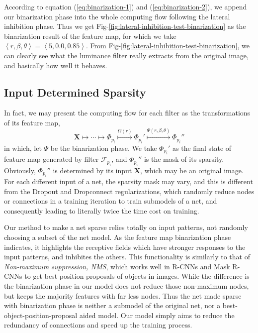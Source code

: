 \documentclass[conference]{IEEEtran}
\begin{document}
According to equation (\ref{eq:binarization-1}) and (\ref{eq:binarization-2}), we append our binarization phase
into the whole computing flow following the lateral inhibition phase. Thus we get
Fig-\ref{fig:lateral-inhibition-test-binarization}
as the binarization result of the feature map, for which we take
$\left<r,\beta,\theta\right>=\left<5,0.0,0.85\right>$.
From Fig-\ref{fig:lateral-inhibition-test-binarization},
we can clearly see what the luminance filter really extracts
from the original image, and basically how well it behaves.

\subsection{Input Determined Sparsity}
In fact, we may present the computing flow for each filter as the transformations of its feature map,
$$\mathbf{X}\longmapsto\cdots\longmapsto\Phi_{p_i}
\overset{\Omega(r)}{\longmapsto}\Phi_{p_i}'
\overset{\Psi(r,\beta,\theta)}{\longmapsto}\Phi_{p_i}''$$
in which, let $\Psi$ be the binarization phase.
We take $\Phi_{p_i}'$ as the final state of feature map generated by
filter $\mathcal{F}_{p_i}$, and $\Phi_{p_i}''$ is the mask of its sparsity.
Obviously, $\Phi_{p_i}''$ is determined by its input $\mathbf{X}$, which may be an original image.
For each different input of a net, the sparsity mask may vary,
and this is different from the Dropout\cite{hinton2012improving}
and Dropconnect\cite{wan2013regularization} regularizations, which randomly
reduce nodes or connections in a training iteration to train submodels of a net,
and consequently leading to literally twice the time cost on training\cite{hinton2012improving}.

Our method to make a net sparse relies totally on input patterns, not randomly choosing a
subset of the net model. As the feature map binarization phase indicates, it highlights
the receptive fields which have stronger responses to the input patterns,
and inhibites the others. This functionality is similarly to that of
\emph{Non-maximum suppression, NMS}\cite{dalal2005histograms}, which works well
in R-CNNs and Mask R-CNNs\cite{girshick2014rich} to get best position proposals of
objects in images. While the difference is the binarization phase in our model
does not reduce those non-maximum nodes, but keeps the majority features with
far less nodes. Thus the net made sparse with binarization phase is neither a submodel
of the original net, nor a best-object-position-proposal aided model. Our model simply
aims to reduce the redundancy of connections and speed up the training process.
\end{document}
